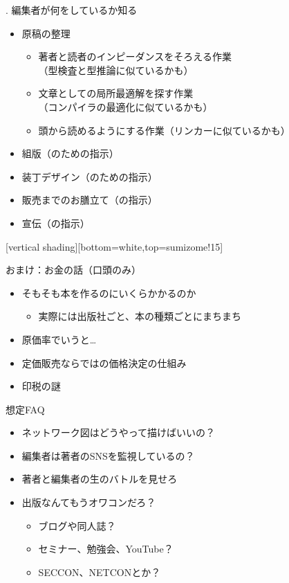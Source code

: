 \documentclass[14pt,dvipdfmx,uplatex]{beamer}
\begin{document}
\begin{frame}[t]{. 編集者が何をしているか知る}
  \sffamily
  \begin{itemize}
    \item 原稿の整理
    \begin{itemize}
      \item 著者と読者のインピーダンスをそろえる作業\\ （型検査と型推論に似ているかも）
      \item 文章としての局所最適解を探す作業\\ （コンパイラの最適化に似ているかも）
      \item 頭から読めるようにする作業（リンカーに似ているかも）
    \end{itemize}
    \item 組版（のための指示）
    \item 装丁デザイン（のための指示）
    \item 販売までのお膳立て（の指示）
    \item 宣伝（の指示）
  \end{itemize}
\end{frame}

[vertical shading][bottom=white,top=sumizome!15]

\begin{frame}[t]{\inhibitglue おまけ：お金の話（口頭のみ）}
  \sffamily
  \begin{itemize}
    \item そもそも本を作るのにいくらかかるのか
    \begin{itemize}
      \item 実際には出版社ごと、本の種類ごとにまちまち
    \end{itemize}
    \item 原価率でいうと…
    \item 定価販売ならではの価格決定の仕組み
    \item 印税の謎
  \end{itemize}
\end{frame}

\begin{frame}[t]{\inhibitglue 想定FAQ}
  \sffamily
  \begin{itemize}
    \item ネットワーク図はどうやって描けばいいの？
    \item 編集者は著者のSNSを監視しているの？
    \item 著者と編集者の生のバトルを見せろ
    \item 出版なんてもうオワコンだろ？
      \begin{itemize}
        \item ブログや同人誌？
        \item セミナー、勉強会、YouTube？
        \item SECCON、NETCONとか？
      \end{itemize}
  \end{itemize}
\end{frame}
\end{document}
